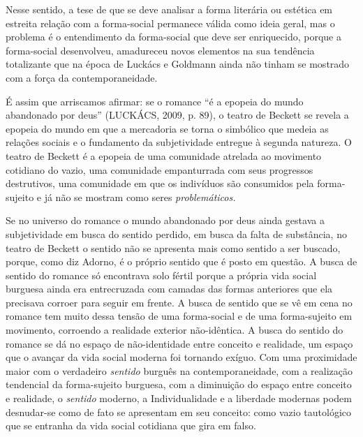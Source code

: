Nesse sentido, a tese de que se deve analisar a forma literária ou
estética em estreita relação com a forma-social permanece válida como
ideia geral, mas o problema é o entendimento da forma-social que deve
ser enriquecido, porque a forma-social desenvolveu, amadureceu novos
elementos na sua tendência totalizante que na época de Luckács e
Goldmann ainda não tinham se mostrado com a força da contemporaneidade.

É assim que arriscamos afirmar: se o romance ``é a epopeia do mundo
abandonado por deus'' (LUCKÁCS, 2009, p. 89), o teatro de Beckett se
revela a epopeia do mundo em que a mercadoria se torna o simbólico que
medeia as relações sociais e o fundamento da subjetividade entregue à
segunda natureza. O teatro de Beckett é a epopeia de uma comunidade
atrelada ao movimento cotidiano do vazio, uma comunidade empanturrada
com seus progressos destrutivos, uma comunidade em que os indivíduos são
consumidos pela forma-sujeito e já não se mostram como seres
\emph{problemáticos.}

Se no universo do romance o mundo abandonado por deus ainda gestava a
subjetividade em busca do sentido perdido, em busca da falta de
substância, no teatro de Beckett o sentido não se apresenta mais como
sentido a ser buscado, porque, como diz Adorno, é o próprio sentido que
é posto em questão. A busca de sentido do romance só encontrava solo
fértil porque a própria vida social burguesa ainda era entrecruzada com
camadas das formas anteriores que ela precisava corroer para seguir em
frente. A busca de sentido que se vê em cena no romance tem muito dessa
tensão de uma forma-social e de uma forma-sujeito em movimento,
corroendo a realidade exterior não-idêntica. A busca do sentido do
romance se dá no espaço de não-identidade entre conceito e realidade, um
espaço que o avançar da vida social moderna foi tornando exíguo. Com uma
proximidade maior com o verdadeiro \emph{sentido} burguês na
contemporaneidade, com a realização tendencial da forma-sujeito
burguesa, com a diminuição do espaço entre conceito e realidade, o
\emph{sentido} moderno, a Individualidade e a liberdade modernas podem
desnudar-se como de fato se apresentam em seu conceito: como vazio
tautológico que se entranha da vida social cotidiana que gira em falso.

